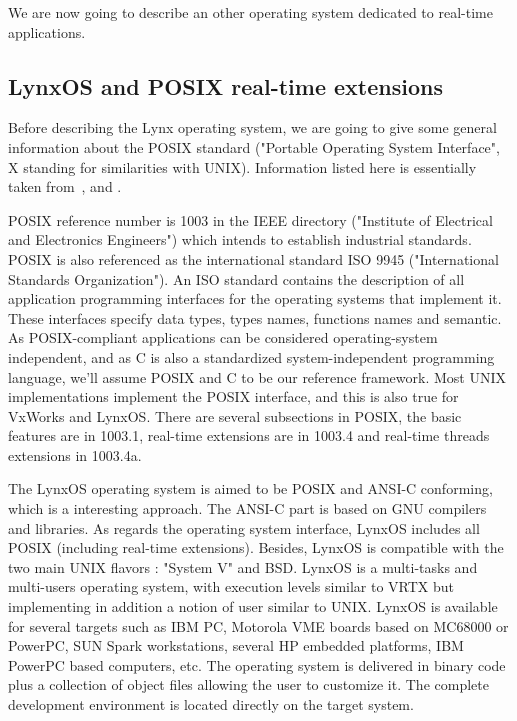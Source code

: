 \documentclass[10pt]{report}
\begin{document}
We are now going to describe an other operating system dedicated 
to real-time applications.

\subsection{LynxOS and POSIX real-time extensions}

Before describing the Lynx operating system, we are going to give 
some general information about the POSIX standard ("Portable 
Operating System Interface", X standing for similarities with 
UNIX). Information listed here is essentially taken from~\cite{LYNX}, \cite{JMR:93} and \cite{JMR:94}.

POSIX reference number is 1003 in the IEEE directory ("Institute 
of Electrical and Electronics Engineers") which intends to 
establish industrial standards. POSIX is also referenced as the 
international standard ISO 9945 ("International Standards 
Organization"). An ISO standard contains the description of all 
application programming interfaces for the operating systems that 
implement it. These interfaces specify data types, types names, 
functions names and semantic. As POSIX-compliant applications can 
be considered operating-system independent, and as C is also a 
standardized system-independent programming language, we'll 
assume POSIX and C to be our reference framework. Most UNIX 
implementations implement the POSIX interface, and this is also 
true for VxWorks and LynxOS. There are several subsections in 
POSIX, the basic features are in 1003.1, real-time extensions are 
in 1003.4 and real-time threads extensions in 1003.4a.

The LynxOS operating system is aimed to be POSIX and ANSI-C 
conforming, which is a interesting approach. The ANSI-C part is 
based on GNU compilers and libraries. As regards the operating 
system interface, LynxOS includes all POSIX (including real-time 
extensions). Besides, LynxOS is compatible with the two main UNIX 
flavors : "System V" and BSD. LynxOS is a multi-tasks and 
multi-users operating system, with execution levels similar to 
VRTX but implementing in addition a notion of user similar to 
UNIX. LynxOS is available for several targets such as IBM PC, 
Motorola VME boards based on MC68000 or PowerPC, SUN Spark 
workstations, several HP embedded platforms, IBM PowerPC based 
computers, etc. The operating system is delivered in binary code 
plus a collection of object files allowing the user to customize 
it. The complete development environment is located directly on 
the target system.
\end{document}
